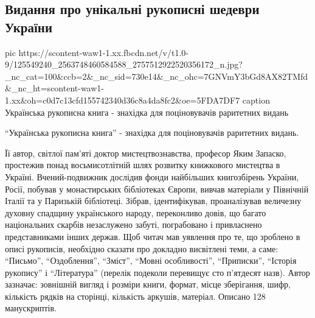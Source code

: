  
 
 

\subsection{Видання про унікальні рукописні шедеври України}


\ifcmt
pic https://scontent-waw1-1.xx.fbcdn.net/v/t1.0-9/125549240_2563748460584588_2757512922520356172_n.jpg?_nc_cat=100&ccb=2&_nc_sid=730e14&_nc_ohc=7GNVmY3bGd8AX82TMfd&_nc_ht=scontent-waw1-1.xx&oh=c0d7c13cfd155742340d36c8a4da8fc2&oe=5FDA7DF7
caption Українська рукописна книга - знахідка для поціновувачів раритетних видань
\fi

\enquote{Українська рукописна книга} - знахідка для поціновувачів раритетних
видань.

Її автор, світлої пам’яті доктор мистецтвознавства, професор Яким Запаско,
простежив понад восьмисотлітній шлях розвитку книжкового мистецтва в Україні.
Вчений-подвижник дослідив фонди найбільших книгозбірень України, Росії, побував
у монастирських бібліотеках Європи, вивчав матеріали у Північній Італії та у
Паризькій бібліотеці. Зібрав, ідентифікував, проаналізував величезну духовну
спадщину українського народу, переконливо довів, що багато національних скарбів
незаслужено забуті, пограбовано і привласнено представниками інших держав. Щоб
читач мав уявлення про те, що зроблено в описі рукописів, необхідно сказати про
докладно висвітлені теми, а саме: “Письмо”, “Оздоблення”, “Зміст”, “Мовні
особливості”, “Приписки”, “Історія рукопису” і “Література” (перелік подеколи
перевищує сто п’ятдесят назв). Автор зазначає: зовнішній вигляд і розміри
книги, формат, місце зберігання, шифр, кількість рядків на сторінці, кількість
аркушів, матеріал. Описано 128 манускриптів.

